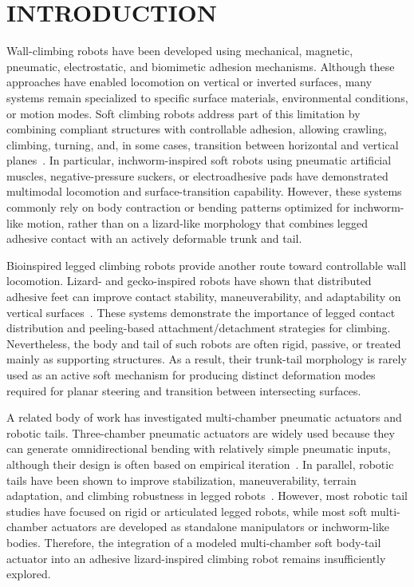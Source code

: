 
\section{INTRODUCTION}

Wall-climbing robots have been developed using mechanical, magnetic, pneumatic, electrostatic, and biomimetic adhesion mechanisms. Although these approaches have enabled locomotion on vertical or inverted surfaces, many systems remain specialized to specific surface materials, environmental conditions, or motion modes. Soft climbing robots address part of this limitation by combining compliant structures with controllable adhesion, allowing crawling, climbing, turning, and, in some cases, transition between horizontal and vertical planes~\cite{Gu2018SoftWallClimbing,Zhang2022Inchworm,Chen2023Flipping,Pang2022Microrobot}. In particular, inchworm-inspired soft robots using pneumatic artificial muscles, negative-pressure suckers, or electroadhesive pads have demonstrated multimodal locomotion and surface-transition capability. However, these systems commonly rely on body contraction or bending patterns optimized for inchworm-like motion, rather than on a lizard-like morphology that combines legged adhesive contact with an actively deformable trunk and tail.

Bioinspired legged climbing robots provide another route toward controllable wall locomotion. Lizard- and gecko-inspired robots have shown that distributed adhesive feet can improve contact stability, maneuverability, and adaptability on vertical surfaces~\cite{Nishad2022Lizard}. These systems demonstrate the importance of legged contact distribution and peeling-based attachment/detachment strategies for climbing. Nevertheless, the body and tail of such robots are often rigid, passive, or treated mainly as supporting structures. As a result, their trunk-tail morphology is rarely used as an active soft mechanism for producing distinct deformation modes required for planar steering and transition between intersecting surfaces.

A related body of work has investigated multi-chamber pneumatic actuators and robotic tails. Three-chamber pneumatic actuators are widely used because they can generate omnidirectional bending with relatively simple pneumatic inputs, although their design is often based on empirical iteration~\cite{Lamping2022ModularActuator}. In parallel, robotic tails have been shown to improve stabilization, maneuverability, terrain adaptation, and climbing robustness in legged robots~\cite{Saab2018RoboticTails,Buckley2023TailStiffness,Yang2023TailControl}. However, most robotic tail studies have focused on rigid or articulated legged robots, while most soft multi-chamber actuators are developed as standalone manipulators or inchworm-like bodies. Therefore, the integration of a modeled multi-chamber soft body-tail actuator into an adhesive lizard-inspired climbing robot remains insufficiently explored.

